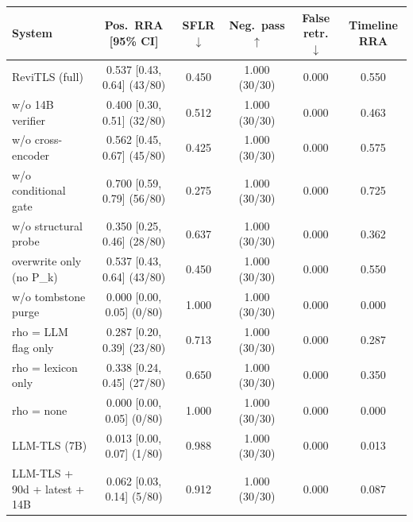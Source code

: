 \begin{tabular}{@{}lccccc@{}}
\toprule
\textbf{System} & \textbf{Pos.\ RRA} [95\% CI] & \textbf{SFLR} $\downarrow$ & \textbf{Neg.\ pass} $\uparrow$ & \textbf{False retr.} $\downarrow$ & \textbf{Timeline RRA} \\
\midrule
ReviTLS (full) & 0.537 [0.43, 0.64] (43/80) & 0.450 & 1.000 (30/30) & 0.000 & 0.550 \\
w/o 14B verifier & 0.400 [0.30, 0.51] (32/80) & 0.512 & 1.000 (30/30) & 0.000 & 0.463 \\
w/o cross-encoder & 0.562 [0.45, 0.67] (45/80) & 0.425 & 1.000 (30/30) & 0.000 & 0.575 \\
w/o conditional gate & 0.700 [0.59, 0.79] (56/80) & 0.275 & 1.000 (30/30) & 0.000 & 0.725 \\
w/o structural probe & 0.350 [0.25, 0.46] (28/80) & 0.637 & 1.000 (30/30) & 0.000 & 0.362 \\
overwrite only (no P\_k) & 0.537 [0.43, 0.64] (43/80) & 0.450 & 1.000 (30/30) & 0.000 & 0.550 \\
w/o tombstone purge & 0.000 [0.00, 0.05] (0/80) & 1.000 & 1.000 (30/30) & 0.000 & 0.000 \\
rho = LLM flag only & 0.287 [0.20, 0.39] (23/80) & 0.713 & 1.000 (30/30) & 0.000 & 0.287 \\
rho = lexicon only & 0.338 [0.24, 0.45] (27/80) & 0.650 & 1.000 (30/30) & 0.000 & 0.350 \\
rho = none & 0.000 [0.00, 0.05] (0/80) & 1.000 & 1.000 (30/30) & 0.000 & 0.000 \\
LLM-TLS (7B) & 0.013 [0.00, 0.07] (1/80) & 0.988 & 1.000 (30/30) & 0.000 & 0.013 \\
LLM-TLS + 90d + latest + 14B & 0.062 [0.03, 0.14] (5/80) & 0.912 & 1.000 (30/30) & 0.000 & 0.087 \\
\bottomrule
\end{tabular}
